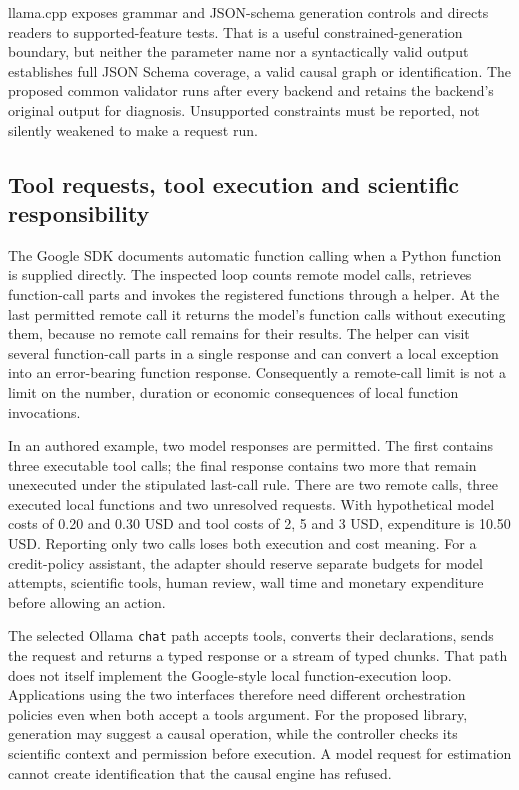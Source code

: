 llama.cpp exposes grammar and JSON-schema generation controls and directs
readers to supported-feature tests. That is a useful constrained-generation
boundary, but neither the parameter name nor a syntactically valid output
establishes full JSON Schema coverage, a valid causal graph or identification.
The proposed common validator runs after every backend and retains the
backend's original output for diagnosis. Unsupported constraints must be
reported, not silently weakened to make a request run.
\citep{exec24_backend_llamacpp,exec24_backend_reference}

\subsection{Tool requests, tool execution and scientific responsibility}

The Google SDK documents automatic function calling when a Python function
is supplied directly. The inspected loop counts remote model calls, retrieves
function-call parts and invokes the registered functions through a helper.
At the last permitted remote call it returns the model's function calls
without executing them, because no remote call remains for their results.
The helper can visit several function-call parts in a single response and
can convert a local exception into an error-bearing function response.
Consequently a remote-call limit is not a limit on the number, duration or
economic consequences of local function invocations.
\citep{exec24_backend_google}

In an authored example, two model responses are permitted. The first contains
three executable tool calls; the final response contains two more that remain
unexecuted under the stipulated last-call rule. There are two remote calls,
three executed local functions and two unresolved requests. With hypothetical
model costs of 0.20 and 0.30 USD and tool costs of 2, 5 and 3 USD, expenditure
is 10.50 USD. Reporting only two calls loses both execution and cost meaning.
For a credit-policy assistant, the adapter should reserve separate budgets
for model attempts, scientific tools, human review, wall time and monetary
expenditure before allowing an action.
\citep{exec24_backend_reference}

The selected Ollama \texttt{chat} path accepts tools, converts their
declarations, sends the request and returns a typed response or a stream of
typed chunks. That path does not itself implement the Google-style local
function-execution loop. Applications using the two interfaces therefore
need different orchestration policies even when both accept a tools argument.
For the proposed library, generation may suggest a causal operation, while
the controller checks its scientific context and permission before execution.
A model request for estimation cannot create identification that the causal
engine has refused.\citep{exec24_backend_ollama,exec24_backend_reference}

